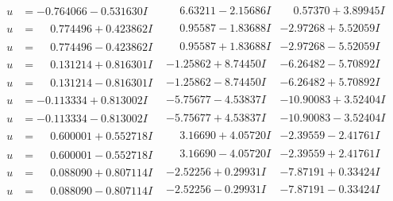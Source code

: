 \documentclass[1p]{elsarticle_modified}
\theoremstyle{definition}
\begin{document}
$$\begin{array}{c|c|c}
\begin{aligned}
u &= -0.764066 - 0.531630 I\end{aligned}
 & \phantom{-}6.63211 - 2.15686 I & \phantom{-}0.57370 + 3.89945 I \\ \hline\begin{aligned}
u &= \phantom{-}0.774496 + 0.423862 I\end{aligned}
 & \phantom{-}0.95587 - 1.83688 I & -2.97268 + 5.52059 I \\ \hline\begin{aligned}
u &= \phantom{-}0.774496 - 0.423862 I\end{aligned}
 & \phantom{-}0.95587 + 1.83688 I & -2.97268 - 5.52059 I \\ \hline\begin{aligned}
u &= \phantom{-}0.131214 + 0.816301 I\end{aligned}
 & -1.25862 + 8.74450 I & -6.26482 - 5.70892 I \\ \hline\begin{aligned}
u &= \phantom{-}0.131214 - 0.816301 I\end{aligned}
 & -1.25862 - 8.74450 I & -6.26482 + 5.70892 I \\ \hline\begin{aligned}
u &= -0.113334 + 0.813002 I\end{aligned}
 & -5.75677 - 4.53837 I & -10.90083 + 3.52404 I \\ \hline\begin{aligned}
u &= -0.113334 - 0.813002 I\end{aligned}
 & -5.75677 + 4.53837 I & -10.90083 - 3.52404 I \\ \hline\begin{aligned}
u &= \phantom{-}0.600001 + 0.552718 I\end{aligned}
 & \phantom{-}3.16690 + 4.05720 I & -2.39559 - 2.41761 I \\ \hline\begin{aligned}
u &= \phantom{-}0.600001 - 0.552718 I\end{aligned}
 & \phantom{-}3.16690 - 4.05720 I & -2.39559 + 2.41761 I \\ \hline\begin{aligned}
u &= \phantom{-}0.088090 + 0.807114 I\end{aligned}
 & -2.52256 + 0.29931 I & -7.87191 + 0.33424 I \\ \hline\begin{aligned}
u &= \phantom{-}0.088090 - 0.807114 I\end{aligned}
 & -2.52256 - 0.29931 I & -7.87191 - 0.33424 I \\ \hline\begin{aligned}

\end{aligned}
\end{array}$$
\end{document}
